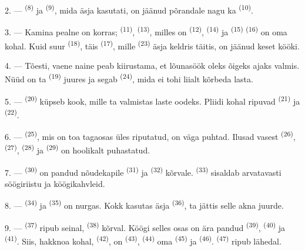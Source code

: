 2. ---  \textsuperscript{(8)} ja 
\textsuperscript{(9)}, mida äsja kasutati, on jäänud põrandale nagu ka
 \textsuperscript{(10)}.

3. --- Kamina pealne on korras;  \textsuperscript{(11)},
 \textsuperscript{(13)}, milles on 
\textsuperscript{(12)},  \textsuperscript{(14)} ja
 \textsuperscript{(15)}  \textsuperscript{(16)} on
oma kohal. Kuid suur  \textsuperscript{(18)}, täis 
\textsuperscript{(17)}, mille  \textsuperscript{(23)} äsja keldris täitis,
on jäänud keset kööki.

4. --- Tõesti, vaene naine peab kiirustama, et lõunasöök oleks õigeks ajaks valmis.
Nüüd on ta  \textsuperscript{(19)} juures ja segab 
\textsuperscript{(24)}, mida ei tohi liialt kõrbeda lasta.

5. ---  \textsuperscript{(20)} küpseb kook, mille ta valmistas laste
oodeks. Pliidi kohal ripuvad  \textsuperscript{(21)} ja
 \textsuperscript{(22)}.

\VUsaut{4.0mm}
\VUsaut{3.0mm}

6. ---  \textsuperscript{(25)}, mis on toa tagaosas üles riputatud, on
väga puhtad. Ilusad vasest  \textsuperscript{(26)},
 \textsuperscript{(27)},  \textsuperscript{(28)} ja
 \textsuperscript{(29)} on hoolikalt puhastatud.

7. ---  \textsuperscript{(30)} on pandud nõudekapile
 \textsuperscript{(31)} ja  \textsuperscript{(32)}
kõrvale.  \textsuperscript{(33)} sisaldab arvatavasti söögiriistu ja
köögikahvleid.

8. ---  \textsuperscript{(34)} ja 
\textsuperscript{(35)} on nurgas. Kokk kasutas äsja 
\textsuperscript{(36)}, ta jättis selle akna juurde.

9. ---  \textsuperscript{(37)} ripub seinal, 
\textsuperscript{(38)} kõrval. Köögi selles osas on ära pandud 
\textsuperscript{(39)},  \textsuperscript{(40)} ja
 \textsuperscript{(41)}. Siis, hakknoa kohal, 
\textsuperscript{(42)}, on  \textsuperscript{(43)}, 
\textsuperscript{(44)} oma  \textsuperscript{(45)} ja 
\textsuperscript{(46)}.  \textsuperscript{(47)} ripub lähedal.

